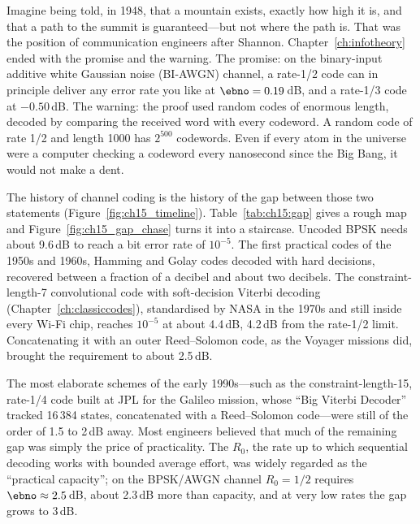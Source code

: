 Imagine being told, in 1948, that a mountain exists, exactly how high it is, and that a path to
the summit is guaranteed---but not where the path is. That was the position of communication
engineers after Shannon. Chapter~\ref{ch:infotheory} ended with the promise and the warning. The
promise: on the binary-input additive white Gaussian noise (BI-AWGN) channel, a rate-1/2 code can
in principle deliver any error rate you like at $\ebno=0.19$\,dB, and a rate-1/3 code at
$-0.50$\,dB. The warning: the proof used random codes of enormous length, decoded by comparing the
received word with every codeword. A random code of rate 1/2 and length 1000 has $2^{500}$
codewords. Even if every atom in the universe were a computer checking a codeword every
nanosecond since the Big Bang, it would not make a dent.

The history of channel coding is the history of the gap between those two statements
(Figure~\ref{fig:ch15_timeline}). Table~\ref{tab:ch15:gap} gives a rough map and
Figure~\ref{fig:ch15_gap_chase} turns it into a staircase. Uncoded BPSK needs about 9.6\,dB to
reach a bit error rate of $10^{-5}$. The first practical codes of the 1950s and 1960s, Hamming and
Golay codes decoded with hard decisions, recovered between a fraction of a decibel and about two
decibels. The constraint-length-7 convolutional code with soft-decision Viterbi decoding
(Chapter~\ref{ch:classiccodes}), standardised by NASA in the 1970s and still inside every Wi-Fi
chip, reaches $10^{-5}$ at about 4.4\,dB, 4.2\,dB from the rate-1/2 limit. Concatenating it with an
outer Reed--Solomon code, as the Voyager missions did, brought the requirement to about 2.5\,dB.

The most elaborate schemes of the early 1990s---such as the constraint-length-15, rate-1/4 code built
at JPL for the Galileo mission, whose ``Big Viterbi Decoder'' tracked 16\,384 states, concatenated
with a Reed--Solomon code---were still of the order of 1.5 to 2\,dB away. Most engineers believed
that much of the remaining gap was simply the price of practicality. The  $R_0$,
the rate up to which sequential decoding works with bounded average effort, was widely regarded as
the ``practical capacity''; on the BPSK/AWGN channel $R_0=1/2$ requires $\ebno\approx2.5$\,dB, about
2.3\,dB more than capacity, and at very low rates the gap grows to 3\,dB.

